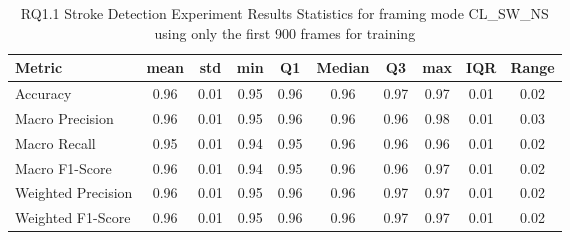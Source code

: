 \begin{table}[h]
\caption{RQ1.1 Stroke Detection Experiment Results Statistics for framing mode CL\_SW\_NS using only the first 900 frames for training}
\label{tab:rq1.1_900_Stroke_Detection_Results_Statistics}
\begin{tabular}{|l|c|c|c|c|c|c|c|c|c|}
\toprule
Metric & mean & std & min & Q1 & Median & Q3 & max & IQR & Range \\
\midrule
Accuracy & 0.96 & 0.01 & 0.95 & 0.96 & 0.96 & 0.97 & 0.97 & 0.01 & 0.02 \\
Macro Precision & 0.96 & 0.01 & 0.95 & 0.96 & 0.96 & 0.96 & 0.98 & 0.01 & 0.03 \\
Macro Recall & 0.95 & 0.01 & 0.94 & 0.95 & 0.96 & 0.96 & 0.96 & 0.01 & 0.02 \\
Macro F1-Score & 0.96 & 0.01 & 0.94 & 0.95 & 0.96 & 0.96 & 0.97 & 0.01 & 0.02 \\
Weighted Precision & 0.96 & 0.01 & 0.95 & 0.96 & 0.96 & 0.97 & 0.97 & 0.01 & 0.02 \\
Weighted F1-Score & 0.96 & 0.01 & 0.95 & 0.96 & 0.96 & 0.97 & 0.97 & 0.01 & 0.02 \\
\bottomrule
\end{tabular}
\end{table}
